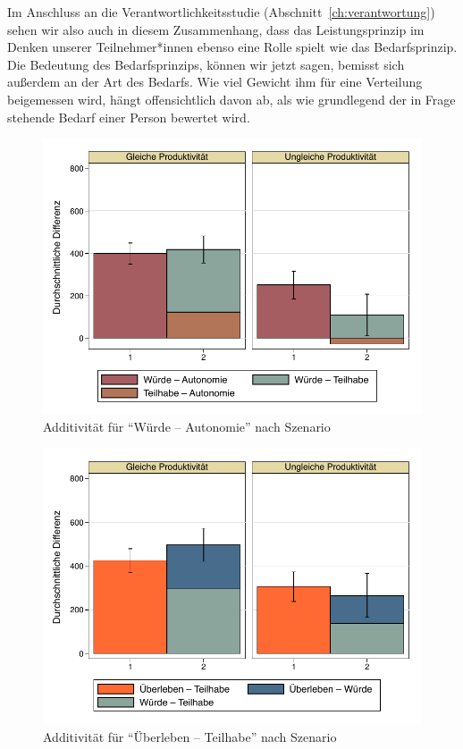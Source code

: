 \documentclass[justified,nobib,nohyper,symmetric,twoside]{tufte-book}
\begin{document}
Im Anschluss an die Verantwortlichkeitsstudie (Abschnitt~\ref{ch:verantwortung}) sehen wir also auch in diesem Zusammenhang, dass das Leistungsprinzip im Denken unserer Teilnehmer*innen ebenso eine Rolle spielt wie das Bedarfsprinzip.
Die Bedeutung des Bedarfsprinzips, können wir jetzt sagen, bemisst sich außerdem an der Art des Bedarfs.
Wie viel Gewicht ihm für eine Verteilung beigemessen wird, hängt offensichtlich davon ab, als wie grundlegend der in Frage stehende Bedarf einer Person bewertet wird.

\clearpage

\begin{figure}[t]\label{fig:abbildung_19}
   \center
   \caption{Additivität für \enquote{Würde -- Autonomie} nach Szenario}
   \includegraphics[width=0.99\linewidth]{figure_19.pdf}
\end{figure}

\begin{figure}[h]\label{fig:abbildung_20}
   \center
   \caption{Additivität für \enquote{Überleben -- Teilhabe} nach Szenario}
   \includegraphics[width=0.99\linewidth]{figure_20.pdf}
\end{figure}
\end{document}
